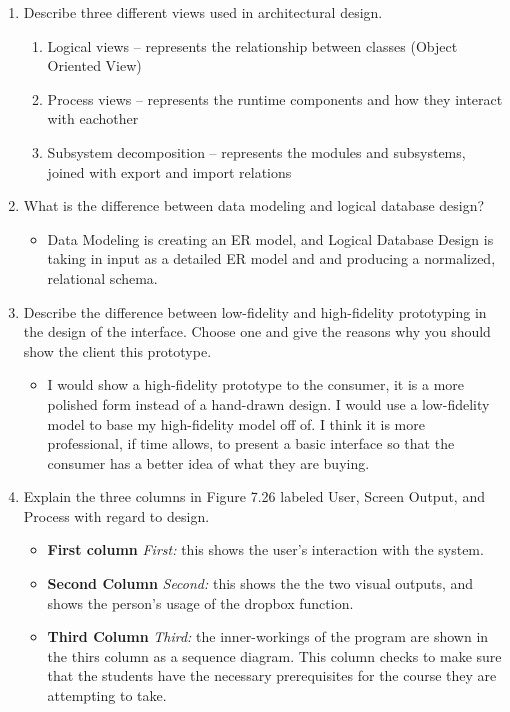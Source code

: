 \documentclass[11pt]{article}
\begin{document}
\begin{enumerate}
    \item Describe three different views used in architectural design. 
    \begin{enumerate}
        \item[] Logical views -- represents the relationship between classes (Object Oriented View)
        \item[] Process views -- represents the runtime components and how they interact with eachother
        \item[] Subsystem decomposition -- represents the modules and subsystems, joined with export and import relations
    \end{enumerate}

    \item What is the difference between data modeling and logical database design?
    \begin{itemize}
        \item[] Data Modeling is creating an ER model, and Logical Database Design is taking in input as a detailed ER model and and producing a normalized, relational schema.
    \end{itemize}

    \item Describe the difference between low-fidelity and high-fidelity prototyping in the design of the interface. Choose one and give the reasons why you should show the client this prototype. 
    \begin{itemize}
        \item[] I would show a high-fidelity prototype to the consumer, it is a more polished form instead of a hand-drawn design. I would use a low-fidelity model to base my high-fidelity model
        off of. I think it is more professional, if time allows, to present a basic interface so that the consumer has a better idea of what they are buying.
    \end{itemize}

    \item Explain the three columns in Figure 7.26 labeled User, Screen Output, and Process with regard to design. 
    \begin{itemize}
        \item[] \textbf{First column } \textit{First:} this shows the user's interaction with the system.
        \item[] \textbf{Second Column } \textit{Second:} this shows the the two visual outputs, and shows the person's usage of the dropbox function.
        \item[] \textbf{Third Column } \textit{Third:} the inner-workings of the program are shown in the thirs column as a sequence diagram. This column checks to make sure that the students have 
        the necessary prerequisites for the course they are attempting to take. 
        \end{itemize}


\end{enumerate}
\end{document}
